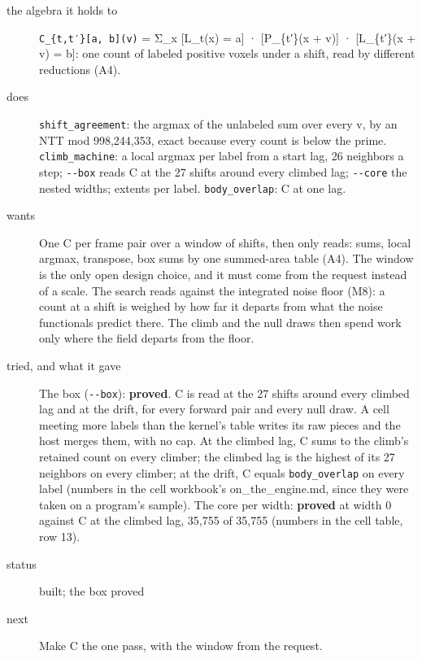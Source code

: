 \begin{description}
\item[{the algebra it holds to}] \texttt{C\_\allowbreak{}\{t,t′\}[a, b](v)} = Σ\_\allowbreak{}x [L\_\allowbreak{}t(x) = a] · [P\_\allowbreak{}\{t′\}(x + v)] · [L\_\allowbreak{}\{t′\}(x + v) = b]: one count of labeled positive voxels under a shift, read by different reductions (A4).
\item[{does}] \texttt{shift\_\allowbreak{}agreement}: the argmax of the unlabeled sum over every v, by an NTT mod 998,244,353, exact because every count is below the prime. \texttt{climb\_\allowbreak{}machine}: a local argmax per label from a start lag, 26 neighbors a step; \texttt{-\allowbreak{}-\allowbreak{}box} reads C at the 27 shifts around every climbed lag; \texttt{-\allowbreak{}-\allowbreak{}core} the nested widths; extents per label. \texttt{body\_\allowbreak{}overlap}: C at one lag.
\item[{wants}] One C per frame pair over a window of shifts, then only reads: sums, local argmax, transpose, box sums by one summed-area table (A4). The window is the only open design choice, and it must come from the request instead of a scale. The search reads against the integrated noise floor (M8): a count at a shift is weighed by how far it departs from what the noise functionals predict there. The climb and the null draws then spend work only where the field departs from the floor.
\item[{tried, and what it gave}] The box (\texttt{-\allowbreak{}-\allowbreak{}box}): \textbf{proved}. C is read at the 27 shifts around every climbed lag and at the drift, for every forward pair and every null draw. A cell meeting more labels than the kernel's table writes its raw pieces and the host merges them, with no cap. At the climbed lag, C sums to the climb's retained count on every climber; the climbed lag is the highest of its 27 neighbors on every climber; at the drift, C equals \texttt{body\_\allowbreak{}overlap} on every label (numbers in the cell workbook's on\_\allowbreak{}the\_\allowbreak{}engine.md, since they were taken on a program's sample). The core per width: \textbf{proved} at width 0 against C at the climbed lag, 35,755 of 35,755 (numbers in the cell table, row 13).
\item[{status}] built; the box proved
\item[{next}] Make C the one pass, with the window from the request.
\end{description}

